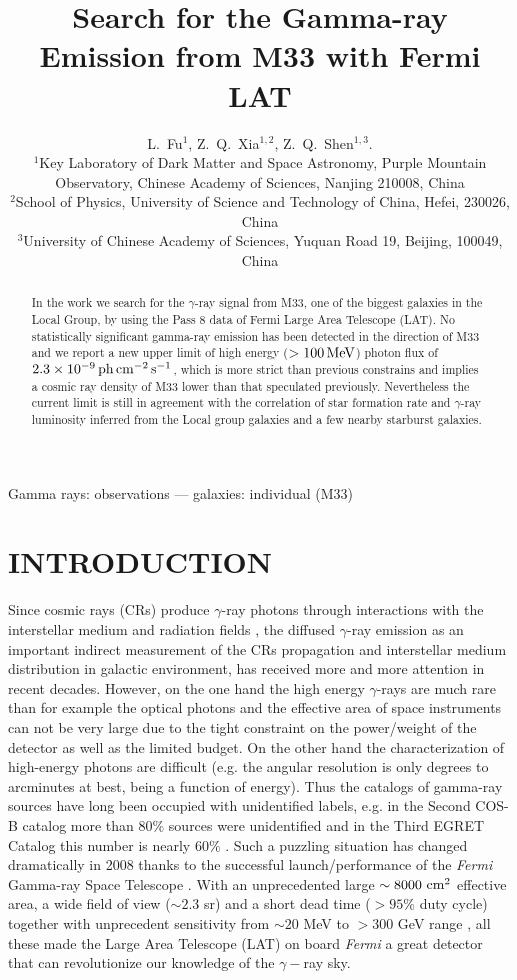 \documentclass[useAMS,usenatbib,referee]{mn2e}
\title[Search for the Gamma-ray Emission from M33 with Fermi LAT]
  {Search for the Gamma-ray Emission from M33 with Fermi LAT}
\author[Lei Fu et al.]
{L.~Fu$^{1}$, Z.~Q.~Xia$^{1,2}$, Z.~Q.~Shen$^{1,3}$.\\
  $^{1}$Key Laboratory of Dark Matter and Space Astronomy, Purple Mountain Observatory, Chinese Academy of Sciences, Nanjing 210008, China\\
  $^{2}$School of Physics, University of Science and Technology of China, Hefei, 230026, China\\
  $^{3}$University of Chinese Academy of Sciences, Yuquan Road 19, Beijing, 100049, China}
\begin{document}
\label{firstpage}
\maketitle

\begin{abstract}
In the work we search for the $\gamma$-ray signal from M33, one of the biggest galaxies in the Local Group, by using the Pass 8 data of Fermi Large Area Telescope (LAT). No statistically significant gamma-ray emission has been detected in the direction of M33 and we report a new upper limit of high energy ($>100\,\rm MeV$) photon flux of $2.3\times 10^{-9}\,\rm ph\,cm^{-2}\,s^{-1}$, which is more strict than previous constrains and implies a cosmic ray density of M33 lower than that speculated previously. Nevertheless the current limit is still in agreement with the correlation of star formation rate and $\gamma$-ray luminosity inferred from the Local group galaxies and a few nearby starburst galaxies.
\end{abstract}

\begin{keywords}
Gamma rays: observations --- galaxies: individual (M33)

\end{keywords}

\section{INTRODUCTION}
Since cosmic rays (CRs) produce $\gamma$-ray photons through interactions with the interstellar medium and radiation fields \citep{smp2007}, the diffused $\gamma$-ray emission as an important indirect measurement of the CRs propagation and interstellar medium distribution in galactic environment, has received more and more attention in recent decades.
However, on the one hand the high energy $\gamma$-rays are much rare than for example the optical photons and the effective area of space instruments can not be very large due to the tight constraint on the power/weight of the detector as well as the limited budget. On the other hand the characterization of high-energy photons are difficult (e.g. the angular resolution is only degrees to arcminutes at best, being a function of energy). Thus the catalogs of gamma-ray sources have long been occupied with unidentified labels, e.g. in the Second COS-B catalog more than $80\%$ sources were unidentified \citep{sbb+1981} and in the Third EGRET Catalog this number is nearly $60\%$ \citep{hbb+1999}. Such a puzzling situation has changed dramatically in 2008 thanks to the successful launch/performance of the {\it Fermi} Gamma-ray Space Telescope \citep{aaa+2009a}. With an unprecedented large $\sim 8000~{\rm cm}^2$ effective area, a wide  field of view ($\sim 2.3$ sr) and a short dead time ($>95\%$ duty cycle) together with unprecedent sensitivity from $\sim 20$ MeV to $> 300$ GeV range \citep{aaa+2009a}, all these made the Large Area Telescope (LAT) on board {\it Fermi} a great detector that can revolutionize our knowledge of the $\gamma-$ray sky.
\end{document}
